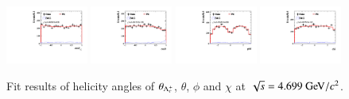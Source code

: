 \begin{figure}[H]\centering
    \includegraphics[width=0.24\textwidth]{figure/polarimetery/angular_plots/pkpi_4700_cos_theta0.pdf}
    \includegraphics[width=0.24\textwidth]{figure/polarimetery/angular_plots/pkpi_4700_cos_theta1.pdf}
    \includegraphics[width=0.24\textwidth]{figure/polarimetery/angular_plots/pkpi_4700_phi1.pdf}
    \includegraphics[width=0.24\textwidth]{figure/polarimetery/angular_plots/pkpi_4700_phi2.pdf}
    \caption{Fit results of helicity angles of $\theta_{\Lambda_{c}^{+}}$, $\theta$, $\phi$ and $\chi$ at $\sqrt{s} = 4.699\gev/c^2$.}
\label{fig:fit_angular_s6}
\end{figure}

